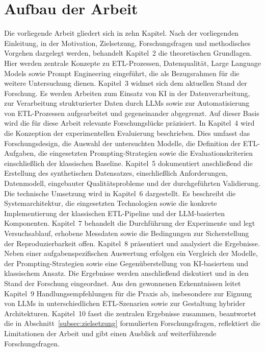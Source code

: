 \section{Aufbau der Arbeit}
\label{sec:aufbau}

Die vorliegende Arbeit gliedert sich in zehn Kapitel. Nach der vorliegenden Einleitung, in der Motivation, Zielsetzung, Forschungsfragen und methodisches Vorgehen dargelegt werden, behandelt Kapitel~2 die theoretischen Grundlagen. Hier werden zentrale Konzepte zu ETL-Prozessen, Datenqualität, Large Language Models sowie Prompt Engineering eingeführt, die als Bezugsrahmen für die weitere Untersuchung dienen.
Kapitel~3 widmet sich dem aktuellen Stand der Forschung. Es werden Arbeiten zum Einsatz von KI in der Datenverarbeitung, zur Verarbeitung strukturierter Daten durch LLMs sowie zur Automatisierung von ETL-Prozessen aufgearbeitet und gegeneinander abgegrenzt. Auf dieser Basis wird die für diese Arbeit relevante Forschungslücke präzisiert.
In Kapitel~4 wird die Konzeption der experimentellen Evaluierung beschrieben. Dies umfasst das Forschungsdesign, die Auswahl der untersuchten Modelle, die Definition der ETL-Aufgaben, die eingesetzten Prompting-Strategien sowie die Evaluationskriterien einschließlich der klassischen Baseline. Kapitel~5 dokumentiert anschließend die Erstellung des synthetischen Datensatzes, einschließlich Anforderungen, Datenmodell, eingebauter Qualitätsprobleme und der durchgeführten Validierung.
Die technische Umsetzung wird in Kapitel~6 dargestellt. Es beschreibt die Systemarchitektur, die eingesetzten Technologien sowie die konkrete Implementierung der klassischen ETL-Pipeline und der LLM-basierten Komponenten. Kapitel~7 behandelt die Durchführung der Experimente und legt Versuchsablauf, erhobene Messdaten sowie die Bedingungen zur Sicherstellung der Reproduzierbarkeit offen.
Kapitel~8 präsentiert und analysiert die Ergebnisse. Neben einer aufgabenspezifischen Auswertung erfolgen ein Vergleich der Modelle, der Prompting-Strategien sowie eine Gegenüberstellung von KI-basiertem und klassischem Ansatz. Die Ergebnisse werden anschließend diskutiert und in den Stand der Forschung eingeordnet. Aus den gewonnenen Erkenntnissen leitet Kapitel~9 Handlungsempfehlungen für die Praxis ab, insbesondere zur Eignung von LLMs in unterschiedlichen ETL-Szenarien sowie zur Gestaltung hybrider Architekturen.
Kapitel~10 fasst die zentralen Ergebnisse zusammen, beantwortet die in Abschnitt~\ref{subsec:zielsetzung} formulierten Forschungsfragen, reflektiert die Limitationen der Arbeit und gibt einen Ausblick auf weiterführende Forschungsfragen.
